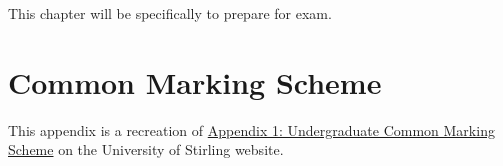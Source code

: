 \documentclass[
]{scrbook}
\begin{document}
This chapter will be specifically to prepare for exam.

\hypertarget{appendix-appendix}{%
\appendix}


\hypertarget{appendexA_CMS}{%
\chapter{Common Marking Scheme}\label{appendexA_CMS}}

This appendix is a recreation of \href{https://www.stir.ac.uk/about/professional-services/student-academic-and-corporate-services/academic-registry/academic-policy-and-practice/quality-handbook/assessment-policy-and-procedure/appendix-1-undergraduate-common-marking-scheme/}{Appendix 1: Undergraduate Common Marking Scheme} on the University of Stirling website.
\end{document}
